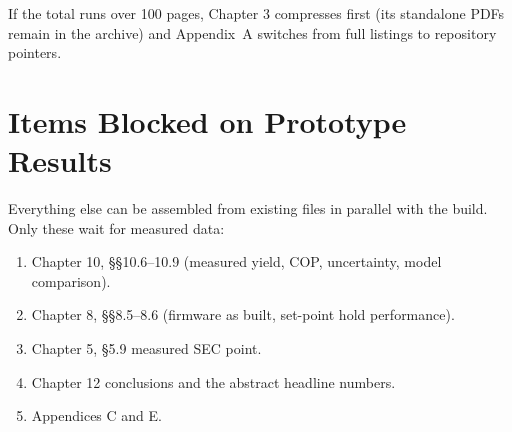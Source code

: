 \documentclass[11pt,a4paper]{article}
\begin{document}
If the total runs over 100 pages, Chapter 3 compresses first (its standalone
PDFs remain in the archive) and Appendix~A switches from full listings to
repository pointers.

\section{Items Blocked on Prototype Results}
Everything else can be assembled from existing files in parallel with the
build. Only these wait for measured data:
\begin{enumerate}[nosep,leftmargin=*]
  \item Chapter 10, \S\S10.6--10.9 (measured yield, COP, uncertainty,
        model comparison).
  \item Chapter 8, \S\S8.5--8.6 (firmware as built, set-point hold performance).
  \item Chapter 5, \S5.9 measured SEC point.
  \item Chapter 12 conclusions and the abstract headline numbers.
  \item Appendices C and E.
\end{enumerate}
\end{document}
